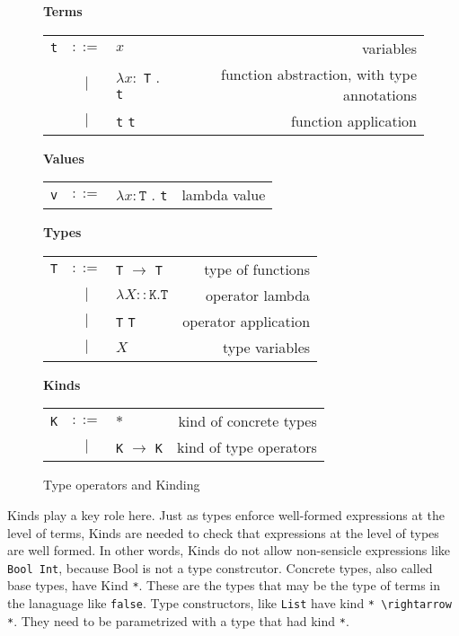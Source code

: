 \begin{figure}[H]\label{fig:tyops}
    \vspace{1cm}
    \textbf{Terms} \\
    \begin{tabular}{l c p{3cm} r}
        \texttt{t} & $ ::= $ & $ x $ &                   variables \\
      & $ | $ & $ \lambda x : $ \texttt{T} . \texttt{t} &          function abstraction, with type annotations \\
      & $ | $ & \texttt{t} \texttt{t} &          function application \\
    \end{tabular}

    \vspace{1cm}
    \textbf{Values} \\
    \begin{tabular}{l c p{3cm} r}
        \texttt{v} & $ ::= $ & $ \lambda x : \texttt{T} $ . \texttt{t} &                   lambda value \\
    \end{tabular}

    \vspace{1cm}
    \textbf{Types} \\
    \begin{tabular}{l c p{3cm} r}
        \texttt{T} & $ ::= $ & \texttt{T} $ \rightarrow $ \texttt{T} &      type of functions \\
        & $ | $ & $ \lambda X :: \texttt{K} . \texttt{T} $ &            operator lambda \\
        & $ | $ & \texttt{T} \texttt{T} &                           operator application \\
        & $ | $ & $ X $ &       type variables \\
    \end{tabular}

    \vspace{1cm}
    \textbf{Kinds} \\
    \begin{tabular}{l c p{3cm} r}
        \texttt{K} & $ ::= $ & $ * $ &      kind of concrete types \\
        & $ | $ & \texttt{K} $ \rightarrow $ \texttt{K} &            kind of type operators
    \end{tabular}

    \caption{Type operators and Kinding}
\end{figure}

Kinds play a key role here. Just as types enforce well-formed expressions at
the level of terms, Kinds are needed to check that expressions at the level of
types are well formed. In other words, Kinds do not allow non-sensicle expressions
like \lstinline{Bool Int}, because Bool is not a type constrcutor. Concrete
types, also called base types, have Kind \lstinline{*}. These are the types
that may be the type of terms in the lanaguage like \lstinline[mathescape]{false}.
Type constructors, like \lstinline{List} have kind \lstinline[mathescape]{* \rightarrow *}.
They need to be parametrized with a type that had kind \lstinline{*}.

